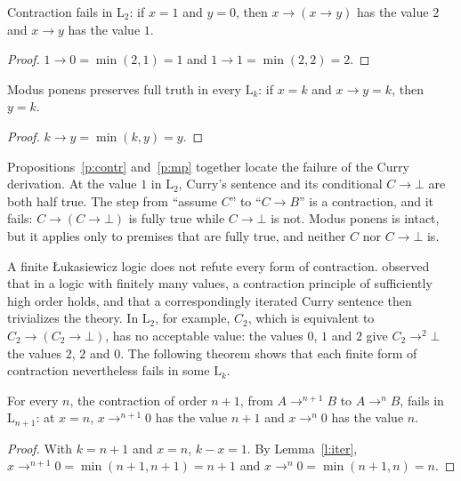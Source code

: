 \documentclass{situationist-preprint}
\begin{document}
\begin{proposition}\label{p:contr}
Contraction fails in $\mathrm{L}_2$: if $x = 1$ and $y = 0$, then $x \to (x \to y)$ has the value $2$ and $x \to y$ has the value $1$.
\end{proposition}

\begin{proof}
$1 \to 0 = \min(2, 1) = 1$ and $1 \to 1 = \min(2, 2) = 2$.
\end{proof}

\begin{proposition}\label{p:mp}
Modus ponens preserves full truth in every $\mathrm{L}_k$: if $x = k$ and $x \to y = k$, then $y = k$.
\end{proposition}

\begin{proof}
$k \to y = \min(k, y) = y$.
\end{proof}

Propositions~\ref{p:contr} and~\ref{p:mp} together locate the failure of the Curry derivation. At the value $1$ in $\mathrm{L}_2$, Curry's sentence and its conditional $C \to \bot$ are both half true. The step from \enquote{assume $C$} to \enquote{$C \to B$} is a contraction, and it fails: $C \to (C \to \bot)$ is fully true while $C \to \bot$ is not. Modus ponens is intact, but it applies only to premises that are fully true, and neither $C$ nor $C \to \bot$ is.

A finite Łukasiewicz logic does not refute every form of contraction. \citet{Moh1954} observed that in a logic with finitely many values, a contraction principle of sufficiently high order holds, and that a correspondingly iterated Curry sentence then trivializes the theory. In $\mathrm{L}_2$, for example, $C_2$, which is equivalent to $C_2 \to (C_2 \to \bot)$, has no acceptable value: the values $0$, $1$ and $2$ give $C_2 \to^2 \bot$ the values $2$, $2$ and $0$. The following theorem shows that each finite form of contraction nevertheless fails in some $\mathrm{L}_k$.

\begin{theorem}\label{t:ncontr}
For every $n$, the contraction of order $n+1$, from $A \to^{n+1} B$ to $A \to^n B$, fails in $\mathrm{L}_{n+1}$: at $x = n$, $x \to^{n+1} 0$ has the value $n + 1$ and $x \to^n 0$ has the value $n$.
\end{theorem}

\begin{proof}
With $k = n + 1$ and $x = n$, $k - x = 1$. By Lemma~\ref{l:iter}, $x \to^{n+1} 0 = \min(n+1, n+1) = n+1$ and $x \to^n 0 = \min(n+1, n) = n$.
\end{proof}
\end{document}
